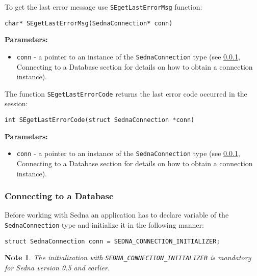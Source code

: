 \documentclass[a4paper,12pt]{article}
\newtheorem{note}{Note}    %
\newenvironment{citemize}
{\begin{itemize}
  \setlength{\itemsep}{0pt}
  \setlength{\parskip}{0pt}
  \setlength{\parsep}{0pt}}
{\end{itemize}}
\begin{document}
To get the last error message use \verb!SEgetLastErrorMsg! function:

\begin{verbatim}
char* SEgetLastErrorMsg(SednaConnection* conn)
\end{verbatim}

\noindent
\textbf{Parameters:}

\begin{citemize}
\item\verb!conn! - a pointer to an instance of the \verb!SednaConnection! type
(see \ref{c-api-connecting}, Connecting to a Database section for details on
how to obtain a connection instance).
\end{citemize}

The function \verb!SEgetLastErrorCode! returns the last error code occurred in
the session:

\begin{verbatim}
int SEgetLastErrorCode(struct SednaConnection *conn)
\end{verbatim}

\noindent
\textbf{Parameters:}

\begin{citemize}
\item\verb!conn! - a pointer to an instance of the \verb!SednaConnection! type
(see \ref{c-api-connecting}, Connecting to a Database section for details on
how to obtain a connection instance).
\end{citemize}


\subsubsection{Connecting to a Database}
\label{c-api-connecting}

Before working with Sedna an application has to declare variable of the
\verb!SednaConnection! type and initialize it in the following manner:

\begin{verbatim}
struct SednaConnection conn = SEDNA_CONNECTION_INITIALIZER;
\end{verbatim}

\begin{note}
The initialization with \verb!SEDNA_CONNECTION_INITIALIZER! is mandatory for
Sedna version 0.5 and earlier.
\end{note}
\end{document}
